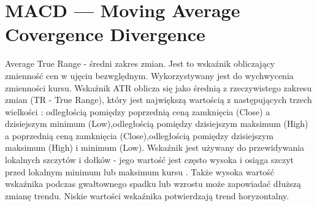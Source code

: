 \section{MACD --- Moving Average Covergence Divergence}
\label{sec:1MACD}

Average True Range - średni zakres zmian. Jest to wskaźnik obliczający zmienność cen w ujęciu bezwględnym.  Wykorzystywany jest do wychwycenia zmienności kursu. Wskaźnik ATR oblicza się jako średnią z rzeczywistego zakresu zmian (TR - True Range), który jest największą wartością z następujących trzech wielkości : odległością pomiędzy poprzednią ceną zamknięcia (Close) a dzisiejszym minimum (Low),odległością pomiędzy dzisiejszym maksimum (High) a poprzednią ceną zamknięcia (Close),odległością pomiędzy dzisiejszym maksimum (High) i minimum (Low). Wskaźnik jest używany do przewidywania lokalnych szczytów i dołków - jego wartość jest często wysoka i osiąga szczyt przed lokalnym minimum lub maksimum kursu . Także wysoka wartość wskaźnika podczas gwałtownego spadku lub wzrostu może zapowiadać dłuższą zmianę trendu. Niskie wartości wskaźnika potwierdzają trend horyzontalny.



\noindent

